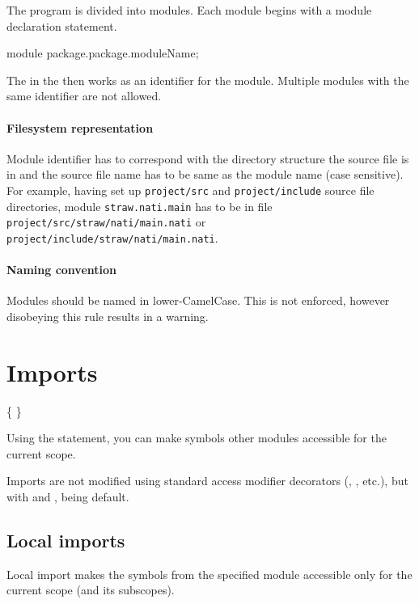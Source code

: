 The program is divided into modules. Each module begins with a module declaration statement.
\begin{code}
module package.package.moduleName;
\end{code}

The  in the  then works as an identifier for the module. Multiple modules with the same identifier are not allowed.

\paragraph{Filesystem representation} Module identifier has to correspond with the directory structure the source file is in and the source file name has to be same as the module name (case sensitive). For example, having set up \verb|project/src| and \verb|project/include| source file directories, module \verb|straw.nati.main| has to be in file \verb|project/src/straw/nati/main.nati| or \verb|project/include/straw/nati/main.nati|.

\paragraph{Naming convention} Modules should be named in lower-CamelCase. This is not enforced, however disobeying this rule results in a warning.

\section{Imports} \label{imports}
\begin{grammar}
	 \{  \}   \kwd{;}
\end{grammar}

Using the  statement, you can make symbols other modules accessible for the current scope.

Imports are not modified using standard access modifier decorators (, , etc.), but with  and ,  being default.

\subsection{Local imports} \label{decorator:local}
Local import makes the symbols from the specified module accessible only for the current scope (and its subscopes).

